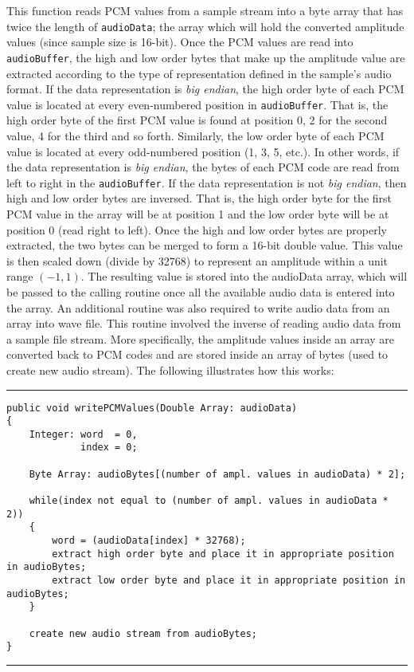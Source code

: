 This function reads PCM values from a sample stream into a byte array that has
twice the length of \verb+audioData+; the array which will hold the converted amplitude
values (since sample size is 16-bit). Once the PCM values are read into \verb+audioBuffer+,
the high and low order bytes that make up the amplitude value are extracted
according to the type of representation defined in the sample's audio format.
If the data representation is {\it big endian}, the high order byte of each PCM value is
located at every even-numbered position in \verb+audioBuffer+. That is, the high order
byte of the first PCM value is found at position 0, 2 for the second value, 4 for
the third and so forth. Similarly, the low order byte of each PCM value is located
at every odd-numbered position (1, 3, 5, etc.). In other words, if the data
representation is {\it big endian}, the bytes of each PCM code are read from left to
right in the \verb+audioBuffer+. If the data representation is not {\it big endian}, then high
and low order bytes are inversed. That is, the high order byte for the first PCM
value in the array will be at position 1 and the low order byte will be at
position 0 (read right to left). Once the high and low order bytes are properly
extracted, the two bytes can be merged to form a 16-bit double value. This value is
then scaled down (divide by 32768) to represent an amplitude within a unit range $(-1, 1)$.
The resulting value is stored into the audioData array, which will be passed to
the calling routine once all the available audio data is entered into the array. An
additional routine was also required to write audio data from an array into wave
file. This routine involved the inverse of reading audio data from a sample file
stream. More specifically, the amplitude values inside an array are converted back
to PCM codes and are stored inside an array of bytes (used to create new audio
stream). The following illustrates how this works:

\vspace{15pt}
\hrule
\begin{verbatim}
public void writePCMValues(Double Array: audioData)
{
    Integer: word  = 0,
             index = 0;

    Byte Array: audioBytes[(number of ampl. values in audioData) * 2];

    while(index not equal to (number of ampl. values in audioData * 2))
    {
        word = (audioData[index] * 32768);
        extract high order byte and place it in appropriate position in audioBytes;
        extract low order byte and place it in appropriate position in audioBytes;
    }

    create new audio stream from audioBytes;
}
\end{verbatim}
\hrule
\vspace{15pt}
